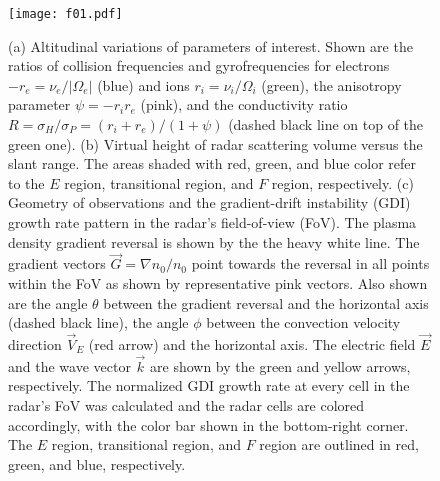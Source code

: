 \begin{figure}
	\centering
	\texttt{[image: f01.pdf]}
	\caption[Overview of altitudinal variations and model setup of MCM]{(a) Altitudinal variations of parameters of interest. Shown are the ratios of collision frequencies and gyrofrequencies for electrons \(-r_e=\nu_e/|\Omega_e|\) (blue) and ions \(r_i=\nu_i/\Omega_i\) (green), the anisotropy parameter \(\psi=-r_i r_e\) (pink), and the conductivity ratio \(R=\sigma_H/\sigma_P = \left(r_i+r_e\right)/\left(1+\psi\right)\) (dashed black line on top of the green one).  (b) Virtual height of radar scattering volume versus the slant range. The areas shaded with red, green, and blue color refer to the \(E\) region, transitional region, and \(F\) region, respectively. (c) Geometry of observations and the gradient-drift instability (GDI) growth rate pattern in the radar's field-of-view (FoV). The plasma density gradient reversal is shown by the the heavy white line. The gradient vectors \(\vec{G}=\nabla n_0/n_0\) point towards the reversal in all points within the FoV as shown by representative pink vectors. Also shown are the angle \(\theta\) between the gradient reversal and the horizontal axis (dashed black line),  the angle \(\phi\) between the convection velocity direction \(\vec{V}_E\) (red arrow) and the horizontal axis. The electric field \(\vec{E}\)  and the wave vector  \(\vec{k}\) are shown by the green and yellow arrows, respectively. The normalized GDI growth rate at every cell in the radar's FoV was calculated and the radar cells are colored accordingly, with the color bar shown in the bottom-right corner.  The \(E\) region, transitional region, and \(F\) region are outlined in red, green, and blue, respectively.}
	\label{fig:1}
\end{figure}



